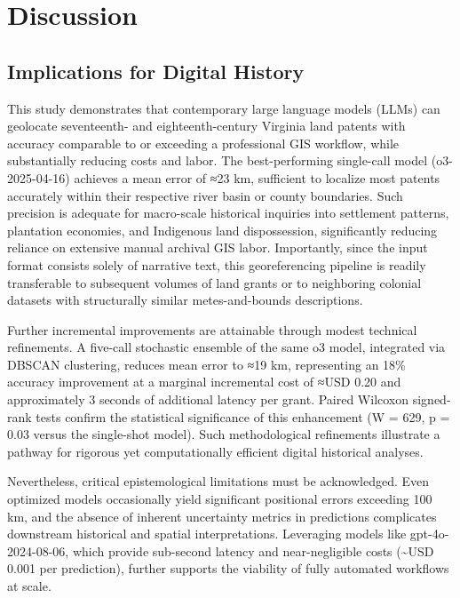 \section{Discussion}\label{discussion}

\subsection{Implications for Digital
History}\label{implications-for-digital-history}

This study demonstrates that contemporary large language models (LLMs)
can geolocate seventeenth- and eighteenth-century Virginia land patents
with accuracy comparable to or exceeding a professional GIS workflow,
while substantially reducing costs and labor. The best-performing
single-call model (o3-2025-04-16) achieves a mean error of ≈23 km,
sufficient to localize most patents accurately within their respective
river basin or county boundaries. Such precision is adequate for
macro-scale historical inquiries into settlement patterns, plantation
economies, and Indigenous land dispossession, significantly reducing
reliance on extensive manual archival GIS labor. Importantly, since the
input format consists solely of narrative text, this georeferencing
pipeline is readily transferable to subsequent volumes of land grants or
to neighboring colonial datasets with structurally similar
metes-and-bounds descriptions.

Further incremental improvements are attainable through modest technical
refinements. A five-call stochastic ensemble of the same o3 model,
integrated via DBSCAN clustering, reduces mean error to ≈19 km,
representing an 18\% accuracy improvement at a marginal incremental cost
of ≈USD 0.20 and approximately 3 seconds of additional latency per
grant. Paired Wilcoxon signed-rank tests confirm the statistical
significance of this enhancement (W = 629, p = 0.03 versus the
single-shot model). Such methodological refinements illustrate a pathway
for rigorous yet computationally efficient digital historical analyses.

Nevertheless, critical epistemological limitations must be acknowledged.
Even optimized models occasionally yield significant positional errors
exceeding 100 km, and the absence of inherent uncertainty metrics in
predictions complicates downstream historical and spatial
interpretations. Leveraging models like gpt-4o-2024-08-06, which provide
sub-second latency and near-negligible costs (\textasciitilde USD 0.001
per prediction), further supports the viability of fully automated
workflows at scale.

